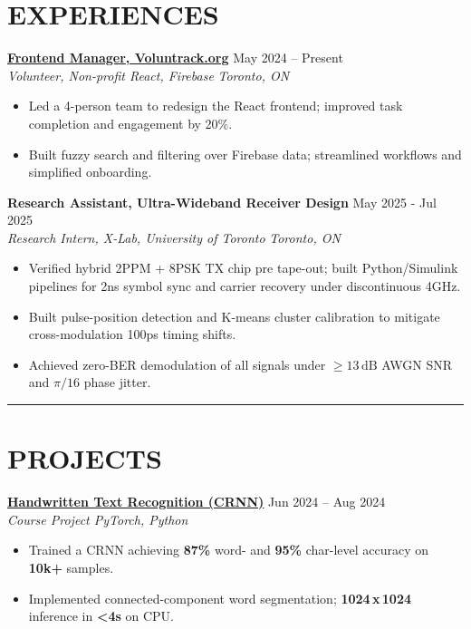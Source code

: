 \documentclass[letterpaper,10pt]{article}
\begin{document}
\section*{\textbf{EXPERIENCES}}
\noindent\href{https://volun-track.web.app}{\uline{\textbf{Frontend Manager, Voluntrack.org}}} \hfill May 2024 -- Present\\
\textit{Volunteer, Non-profit \textbar{} React, Firebase} \hfill \textit{Toronto, ON}
\begin{itemize}
    \item Led a 4-person team to redesign the React frontend; improved task completion and engagement by 20\%.
    \item Built fuzzy search and filtering over Firebase data; streamlined workflows and simplified onboarding.
\end{itemize}

\vspace{0.2cm}
\noindent
\textbf{Research Assistant, Ultra-Wideband Receiver Design} \hfill May 2025 - Jul 2025\\
\textit{Research Intern, X-Lab, University of Toronto} \hfill \textit{Toronto, ON}
\begin{itemize}[leftmargin=0.2in]
    \item Verified hybrid 2PPM + 8PSK TX chip pre tape-out; built Python/Simulink pipelines for 2ns symbol sync and carrier recovery under discontinuous 4GHz.
	\item Built pulse-position detection and K-means cluster calibration to mitigate cross-modulation 100ps timing shifts.
    \item Achieved zero-BER demodulation of all signals under $\geq 13\,\mathrm{dB}$ AWGN SNR and $\pi/16$ phase jitter.
\end{itemize}

\noindent\rule{\linewidth}{1pt}

\section*{\textbf{PROJECTS}}
\noindent\href{https://github.com/Ken-2511/HandwritingRecognition}{\uline{\textbf{Handwritten Text Recognition (CRNN)}}} \hfill Jun 2024 -- Aug 2024\\
\textit{Course Project \textbar{} PyTorch, Python}
\begin{itemize}
    \item Trained a CRNN achieving \textbf{87\%} word- and \textbf{95\%} char-level accuracy on \textbf{10k+} samples.
    \item Implemented connected-component word segmentation; \textbf{1024\,x\,1024} inference in \textbf{\textless 4s} on CPU.
\end{itemize}
\end{document}
